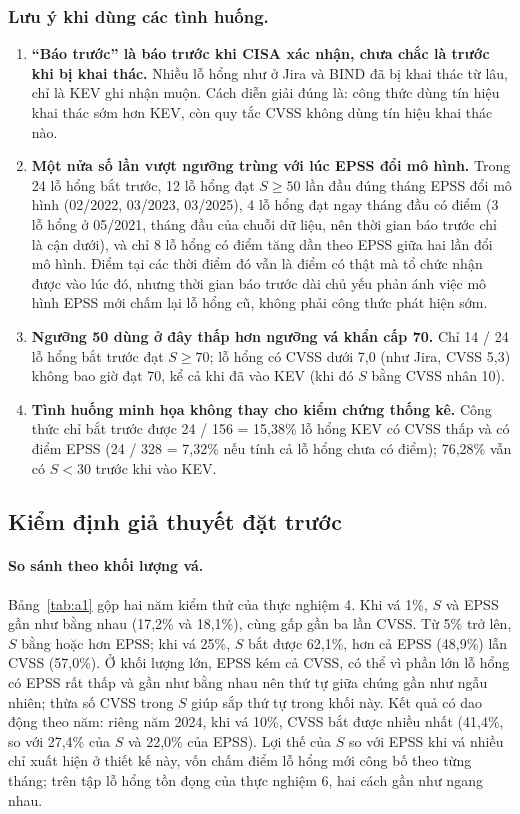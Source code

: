 \documentclass[runningheads]{llncs}
\begin{document}
\subsubsection{Lưu ý khi dùng các tình huống.}
\begin{enumerate}
\item \textbf{``Báo trước'' là báo trước khi CISA xác nhận, chưa chắc là trước khi bị khai thác.} Nhiều lỗ hổng
như ở Jira và BIND đã bị khai thác từ lâu, chỉ là KEV ghi nhận muộn. Cách diễn giải đúng là: công thức dùng tín hiệu khai
thác sớm hơn KEV, còn quy tắc CVSS không dùng tín hiệu khai thác nào.
\item \textbf{Một nửa số lần vượt ngưỡng trùng với lúc EPSS đổi mô hình.} Trong 24 lỗ hổng bắt trước, 12 lỗ hổng
đạt $S \ge 50$ lần đầu đúng tháng EPSS đổi mô hình (02/2022, 03/2023, 03/2025), 4 lỗ hổng đạt ngay tháng đầu có
điểm (3 lỗ hổng ở 05/2021, tháng đầu của chuỗi dữ liệu, nên thời gian báo trước chỉ là cận dưới), và chỉ 8 lỗ
hổng có điểm tăng dần theo EPSS giữa hai lần đổi mô hình. Điểm tại các thời điểm đó vẫn là điểm có thật mà tổ
chức nhận được vào lúc đó, nhưng thời gian báo trước dài chủ yếu phản ánh việc mô hình EPSS mới chấm lại lỗ hổng
cũ, không phải công thức phát hiện sớm.
\item \textbf{Ngưỡng 50 dùng ở đây thấp hơn ngưỡng vá khẩn cấp 70.} Chỉ 14 / 24 lỗ hổng bắt trước đạt
$S \ge 70$; lỗ hổng có CVSS dưới 7,0 (như Jira, CVSS 5,3) không bao giờ đạt 70, kể cả khi đã vào KEV (khi đó $S$ bằng CVSS nhân 10).
\item \textbf{Tình huống minh họa không thay cho kiểm chứng thống kê.} Công thức chỉ bắt trước được
24 / 156 = 15,38\% lỗ hổng KEV có CVSS thấp và có điểm EPSS (24 / 328 = 7,32\% nếu tính cả lỗ hổng chưa có điểm);
76,28\% vẫn có $S < 30$ trước khi vào KEV.
\end{enumerate}

\subsection{Kiểm định giả thuyết đặt trước}

\paragraph{So sánh theo khối lượng vá.} Bảng~\ref{tab:a1} gộp hai năm kiểm thử của thực nghiệm
4. Khi vá 1\%, $S$ và EPSS gần như bằng nhau (17,2\% và 18,1\%), cùng gấp gần ba lần CVSS. Từ 5\%
trở lên, $S$ bằng hoặc hơn EPSS; khi vá 25\%, $S$ bắt được 62,1\%, hơn cả EPSS (48,9\%) lẫn CVSS
(57,0\%). Ở khối lượng lớn, EPSS kém cả CVSS, có thể vì phần lớn lỗ hổng có EPSS rất thấp và gần
như bằng nhau nên thứ tự giữa chúng gần như ngẫu nhiên; thừa số CVSS trong $S$ giúp sắp thứ tự
trong khối này. Kết quả có dao động theo năm: riêng
năm 2024, khi vá 10\%, CVSS bắt được nhiều nhất (41,4\%, so với 27,4\% của $S$ và 22,0\% của EPSS).
Lợi thế của $S$ so với EPSS khi vá nhiều chỉ xuất hiện ở thiết kế này, vốn chấm điểm lỗ hổng mới
công bố theo từng tháng; trên tập lỗ hổng tồn đọng của thực nghiệm 6, hai cách gần như ngang nhau.
\end{document}
